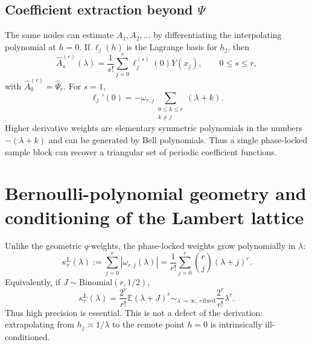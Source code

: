 \documentclass[11pt]{article}
\numberwithin{equation}{section}
\theoremstyle{definition}
\theoremstyle{remark}
\begin{document}
\subsection{Coefficient extraction beyond \texorpdfstring{$\Psi$}{Psi}}

The same nodes can estimate $A_1,A_2,\ldots$ by differentiating the interpolating polynomial at $h=0$. If $\ell_j(h)$ is the Lagrange basis for $h_j$, then
\begin{equation}
\widehat A_s^{(r)}(\lambda)
=\frac1{s!}\sum_{j=0}^{r}\ell_j^{(s)}(0)Y(x_j),
\qquad 0\le s\le r,
\label{p8:eq:As-extractor}
\end{equation}
with $\widehat A_0^{(r)}=\widehat\Psi_r$. For $s=1$,
\begin{equation}
\ell_j'(0)
=-\omega_{r,j}\sum_{\substack{0\le k\le r\\k\ne j}}(\lambda+k).
\label{p8:eq:first-derivative-weight}
\end{equation}
Higher derivative weights are elementary symmetric polynomials in the numbers $-(\lambda+k)$ and can be generated by Bell polynomials. Thus a single phase-locked sample block can recover a triangular set of periodic coefficient functions.

\section{Bernoulli-polynomial geometry and conditioning of the Lambert lattice}
\label{p8:sec:lambert-conditioning}

Unlike the geometric $q$-weights, the phase-locked weights grow polynomially in $\lambda$:
\begin{equation}
\kappa_r^{\mathrm L}(\lambda)
:=\sum_{j=0}^{r}|\omega_{r,j}(\lambda)|
=\frac1{r!}\sum_{j=0}^{r}\binom{r}{j}(\lambda+j)^r.
\label{p8:eq:lambert-condition}
\end{equation}
Equivalently, if $J\sim\mathrm{Binomial}(r,1/2)$,
\begin{equation}
\kappa_r^{\mathrm L}(\lambda)
=\frac{2^r}{r!}\mathbb E(\lambda+J)^r
\sim_{\lambda\to\infty,\,r\,\mathrm{fixed}}\frac{2^r}{r!}\lambda^r.
\label{p8:eq:lambert-condition-asymp}
\end{equation}
Thus high precision is essential. This is not a defect of the derivation: extrapolating from $h_j\asymp1/\lambda$ to the remote point $h=0$ is intrinsically ill-conditioned.
\end{document}
